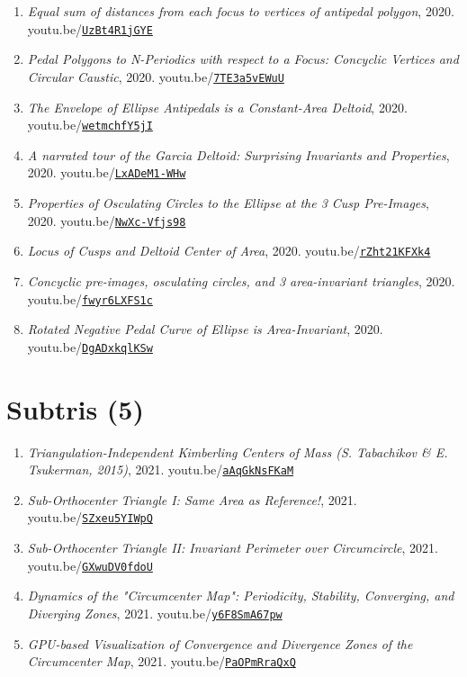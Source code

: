 \documentclass[12pt]{article}
\begin{document}
\begin{enumerate}[resume]
\item \textit{Equal sum of distances from each focus to vertices of antipedal polygon}, 2020. youtu.be/\href{https://youtu.be/UzBt4R1jGYE}{\nolinkurl{UzBt4R1jGYE}}
\item \textit{Pedal Polygons to N-Periodics with respect to a Focus: Concyclic Vertices and Circular Caustic}, 2020. youtu.be/\href{https://youtu.be/7TE3a5vEWuU}{\nolinkurl{7TE3a5vEWuU}}
\item \textit{The Envelope of Ellipse Antipedals is a Constant-Area Deltoid}, 2020. youtu.be/\href{https://youtu.be/wetmchfY5jI}{\nolinkurl{wetmchfY5jI}}
\item \textit{A narrated tour of the Garcia Deltoid: Surprising Invariants and Properties}, 2020. youtu.be/\href{https://youtu.be/LxADeM1-WHw}{\nolinkurl{LxADeM1-WHw}}
\item \textit{Properties of Osculating Circles to the Ellipse at the 3 Cusp Pre-Images}, 2020. youtu.be/\href{https://youtu.be/NwXc-Vfjs98}{\nolinkurl{NwXc-Vfjs98}}
\item \textit{Locus of Cusps and Deltoid Center of Area}, 2020. youtu.be/\href{https://youtu.be/rZht21KFXk4}{\nolinkurl{rZht21KFXk4}}
\item \textit{Concyclic pre-images, osculating circles, and 3 area-invariant triangles}, 2020. youtu.be/\href{https://youtu.be/fwyr6LXFS1c}{\nolinkurl{fwyr6LXFS1c}}
\item \textit{Rotated Negative Pedal Curve of Ellipse is Area-Invariant}, 2020. youtu.be/\href{https://youtu.be/DgADxkqlKSw}{\nolinkurl{DgADxkqlKSw}}
\end{enumerate}

\section{Subtris (5)}

\begin{enumerate}[resume]
\item \textit{Triangulation-Independent Kimberling Centers of Mass (S. Tabachikov \& E. Tsukerman, 2015)}, 2021. youtu.be/\href{https://youtu.be/aAqGkNsFKaM}{\nolinkurl{aAqGkNsFKaM}}
\item \textit{Sub-Orthocenter Triangle I: Same Area as Reference!}, 2021. youtu.be/\href{https://youtu.be/SZxeu5YIWpQ}{\nolinkurl{SZxeu5YIWpQ}}
\item \textit{Sub-Orthocenter Triangle II: Invariant Perimeter over Circumcircle}, 2021. youtu.be/\href{https://youtu.be/GXwuDV0fdoU}{\nolinkurl{GXwuDV0fdoU}}
\item \textit{Dynamics of the "Circumcenter Map": Periodicity, Stability, Converging, and Diverging Zones}, 2021. youtu.be/\href{https://youtu.be/y6F8SmA67pw}{\nolinkurl{y6F8SmA67pw}}
\item \textit{GPU-based Visualization of Convergence and Divergence Zones of the Circumcenter Map}, 2021. youtu.be/\href{https://youtu.be/PaOPmRraQxQ}{\nolinkurl{PaOPmRraQxQ}}
\end{enumerate}
\end{document}
